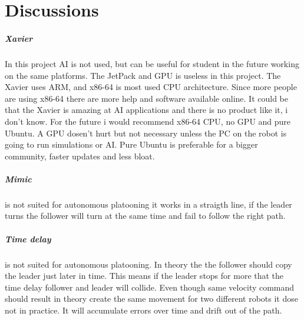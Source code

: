 \chapter{Discussions}

\paragraph{Xavier}
In this project AI is not used, but can be useful for student in the future working on the same platforms. The JetPack and GPU is useless in this project. The Xavier uses ARM, and x86-64 is most used CPU architecture. Since more people are using x86-64 there are more help and software available online. 
It could be that the Xavier is amazing at AI applications and there is no product like it, i don't know. For the future i would recommend x86-64 CPU, no GPU and pure Ubuntu. A GPU dosen't hurt but not necessary unless the PC on the robot is going to run simulations or AI. Pure Ubuntu is preferable for a bigger community, faster updates and less bloat. 

\paragraph{Mimic} is not suited for autonomous platooning it works in a straigth line, if the leader turns the follower will turn at the same time and fail to follow the right path. 

\paragraph{Time delay} is not suited for autonomous platooning. In theory the the follower should copy the leader just later in time. This means if the leader stops for more that the time delay follower and leader will collide. Even though same velocity command should result in theory create the same movement for two different robots it dose not in practice. It will accumulate errors over time and drift out of the path. 

